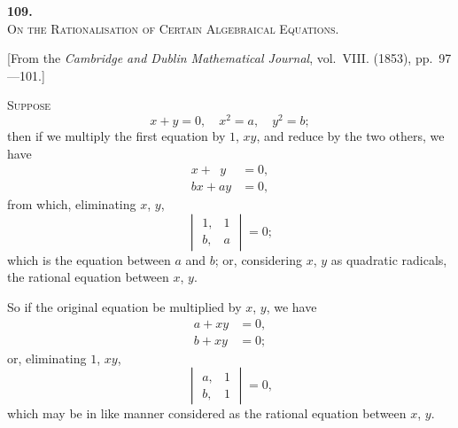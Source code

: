 \documentclass[11pt]{article}
\begin{document}
\begin{center}
{\Large\bfseries 109.}\\[0.5em]
{\large\scshape On the Rationalisation of Certain Algebraical Equations.}
\end{center}
\vspace{0.3em}
\begin{center}
\small [From the \textit{Cambridge and Dublin Mathematical Journal}, vol.~VIII. (1853), pp.~97---101.]
\end{center}
\vspace{0.5em}

\textsc{Suppose}
\[
x + y = 0, \quad x^2 = a, \quad y^2 = b;
\]
then if we multiply the first equation by $1$, $xy$, and reduce by the two others, we have
\begin{align*}
x + \phantom{a}y &= 0,\\
bx + ay &= 0,
\end{align*}
from which, eliminating $x$, $y$,
\[
\begin{vmatrix}
1, & 1 \\
b, & a
\end{vmatrix} = 0;
\]
which is the equation between $a$ and $b$; or, considering $x$, $y$ as quadratic radicals, the rational equation between $x$, $y$.

So if the original equation be multiplied by $x$, $y$, we have
\begin{align*}
a + xy &= 0,\\
b + xy &= 0;
\end{align*}
or, eliminating $1$, $xy$,
\[
\begin{vmatrix}
a, & 1 \\
b, & 1
\end{vmatrix} = 0,
\]
which may be in like manner considered as the rational equation between $x$, $y$.
\end{document}
